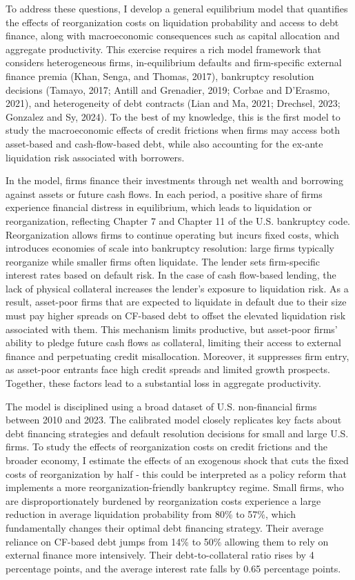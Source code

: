 \documentclass[12pt]{article}
\begin{document}
To address these questions, I develop a general equilibrium model that quantifies the effects of reorganization costs on liquidation probability and access to debt finance, along with macroeconomic consequences such as capital allocation and aggregate productivity. This exercise requires a rich model framework that considers heterogeneous firms, in-equilibrium defaults and firm-specific external finance premia (Khan, Senga, and Thomas, 2017), bankruptcy resolution decisions (Tamayo, 2017; Antill and Grenadier, 2019; Corbae and D'Erasmo, 2021), and heterogeneity of debt contracts (Lian and Ma, 2021; Drechsel, 2023; Gonzalez and Sy, 2024). To the best of my knowledge, this is the first model to study the macroeconomic effects of credit frictions when firms may access both asset-based and cash-flow-based debt, while also accounting for the ex-ante liquidation risk associated with borrowers.

In the model, firms finance their investments through net wealth and borrowing against assets or future cash flows. In each period, a positive share of firms experience financial distress in equilibrium, which leads to liquidation or reorganization, reflecting Chapter 7 and Chapter 11 of the U.S. bankruptcy code. Reorganization allows firms to continue operating but incurs fixed costs, which introduces economies of scale into bankruptcy resolution: large firms typically reorganize while smaller firms often liquidate. The lender sets firm-specific interest rates based on default risk. In the case of cash flow-based lending, the lack of physical collateral increases the lender's exposure to liquidation risk. As a result, asset-poor firms that are expected to liquidate in default due to their size must pay higher spreads on CF-based debt to offset the elevated liquidation risk associated with them. This mechanism limits productive, but asset-poor firms' ability to pledge future cash flows as collateral, limiting their access to external finance and perpetuating credit misallocation. Moreover, it suppresses firm entry, as asset-poor entrants face high credit spreads and limited growth prospects. Together, these factors lead to a substantial loss in aggregate productivity.

The model is disciplined using a broad dataset of U.S. non-financial firms between 2010 and 2023. The calibrated model closely replicates key facts about debt financing strategies and default resolution decisions for small and large U.S. firms. To study the effects of reorganization costs on credit frictions and the broader economy, I estimate the effects of an exogenous shock that cuts the fixed costs of reorganization by half - this could be interpreted as a policy reform that implements a more reorganization-friendly bankruptcy regime. Small firms, who are disproportionately burdened by reorganization costs experience a large reduction in average liquidation probability from 80\% to 57\%, which fundamentally changes their optimal debt financing strategy. Their average reliance on CF-based debt jumps from 14\% to 50\% allowing them to rely on external finance more intensively. Their debt-to-collateral ratio rises by 4 percentage points, and the average interest rate falls by 0.65 percentage points. 
\end{document}
